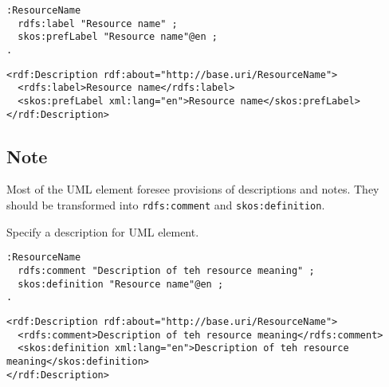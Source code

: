 \vspace{-\parskip}
\begin{minipage}[b]{.394\textwidth}
\begin{lstlisting}[language=Turtle, caption={Labels in Turtle syntax}, captionpos=b]
:ResourceName 
  rdfs:label "Resource name" ;
  skos:prefLabel "Resource name"@en ;
.
\end{lstlisting}
\end{minipage}%
\quad\vspace{-\parskip}
\begin{minipage}[b]{.62\textwidth}
\begin{lstlisting}[language=RDF/XML, caption={Labels in RDF/XML syntax}, captionpos=b]
<rdf:Description rdf:about="http://base.uri/ResourceName">
  <rdfs:label>Resource name</rdfs:label>
  <skos:prefLabel xml:lang="en">Resource name</skos:prefLabel>
</rdf:Description>
\end{lstlisting}
\end{minipage}
\vspace{-\parskip}

\subsection{Note}

Most of the UML element foresee provisions of descriptions and notes. They should be transformed into \texttt{rdfs:comment} and \texttt{skos:definition}. 

\begin{trule}[Description]
	\label{rule:elemen-definition}	
	Specify a description for UML element.
\end{trule}

\vspace{-\parskip}
\begin{minipage}[b]{.45\textwidth}
\begin{lstlisting}[language=Turtle, caption={Description in Turtle syntax}, captionpos=b]
:ResourceName 
  rdfs:comment "Description of teh resource meaning" ;
  skos:definition "Resource name"@en ;
.
\end{lstlisting}
\end{minipage}%
\quad\vspace{-\parskip}
\begin{minipage}[b]{.5\textwidth}
\begin{lstlisting}[language=RDF/XML, caption={Description in RDF/XML syntax}, captionpos=b]
<rdf:Description rdf:about="http://base.uri/ResourceName">
  <rdfs:comment>Description of teh resource meaning</rdfs:comment>
  <skos:definition xml:lang="en">Description of teh resource meaning</skos:definition>
</rdf:Description>
\end{lstlisting}
\end{minipage}
\vspace{-\parskip}

